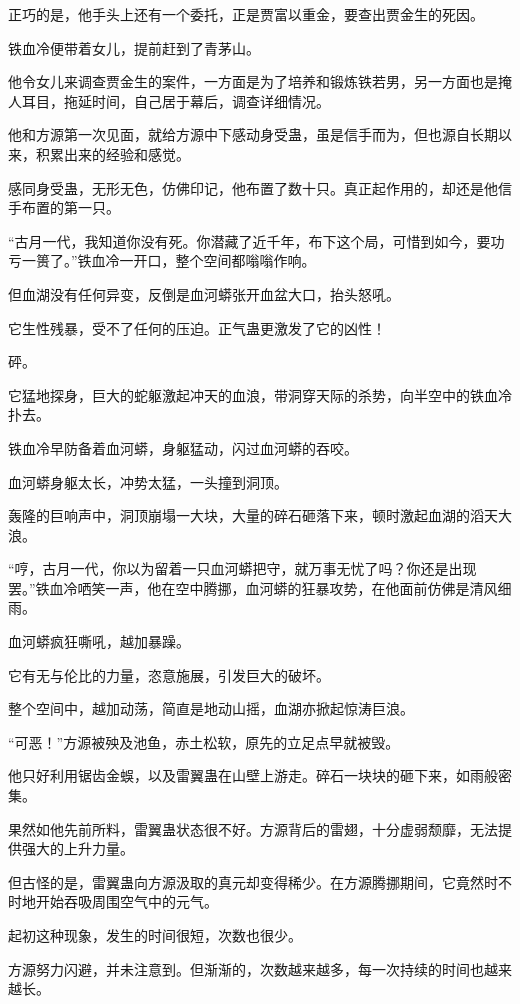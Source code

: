 \begin{this_body}
正巧的是，他手头上还有一个委托，正是贾富以重金，要查出贾金生的死因。

铁血冷便带着女儿，提前赶到了青茅山。

他令女儿来调查贾金生的案件，一方面是为了培养和锻炼铁若男，另一方面也是掩人耳目，拖延时间，自己居于幕后，调查详细情况。

他和方源第一次见面，就给方源中下感动身受蛊，虽是信手而为，但也源自长期以来，积累出来的经验和感觉。

感同身受蛊，无形无色，仿佛印记，他布置了数十只。真正起作用的，却还是他信手布置的第一只。

“古月一代，我知道你没有死。你潜藏了近千年，布下这个局，可惜到如今，要功亏一篑了。”铁血冷一开口，整个空间都嗡嗡作响。

但血湖没有任何异变，反倒是血河蟒张开血盆大口，抬头怒吼。

它生性残暴，受不了任何的压迫。正气蛊更激发了它的凶性！

砰。

它猛地探身，巨大的蛇躯激起冲天的血浪，带洞穿天际的杀势，向半空中的铁血冷扑去。

铁血冷早防备着血河蟒，身躯猛动，闪过血河蟒的吞咬。

血河蟒身躯太长，冲势太猛，一头撞到洞顶。

轰隆的巨响声中，洞顶崩塌一大块，大量的碎石砸落下来，顿时激起血湖的滔天大浪。

“哼，古月一代，你以为留着一只血河蟒把守，就万事无忧了吗？你还是出现罢。”铁血冷哂笑一声，他在空中腾挪，血河蟒的狂暴攻势，在他面前仿佛是清风细雨。

血河蟒疯狂嘶吼，越加暴躁。

它有无与伦比的力量，恣意施展，引发巨大的破坏。

整个空间中，越加动荡，简直是地动山摇，血湖亦掀起惊涛巨浪。

“可恶！”方源被殃及池鱼，赤土松软，原先的立足点早就被毁。

他只好利用锯齿金蜈，以及雷翼蛊在山壁上游走。碎石一块块的砸下来，如雨般密集。

果然如他先前所料，雷翼蛊状态很不好。方源背后的雷翅，十分虚弱颓靡，无法提供强大的上升力量。

但古怪的是，雷翼蛊向方源汲取的真元却变得稀少。在方源腾挪期间，它竟然时不时地开始吞吸周围空气中的元气。

起初这种现象，发生的时间很短，次数也很少。

方源努力闪避，并未注意到。但渐渐的，次数越来越多，每一次持续的时间也越来越长。


\end{this_body}
